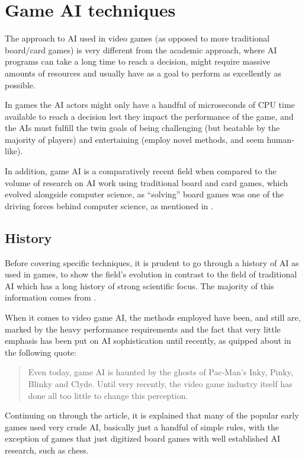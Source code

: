 \documentclass[]{report}
\begin{document}
\section{Game AI techniques}
\label{sec:game-ai-techniques}

The approach to AI used in video games (as opposed to more traditional
board/card games) is very different from the academic approach, where AI
programs can take a long time to reach a decision, might require massive amounts
of resources and usually have as a goal to perform as excellently as possible.

In games the AI actors might only have a handful of microseconds of CPU time
available to reach a decision lest they impact the performance of the game, and
the AIs must fulfill the twin goals of being challenging (but beatable by the
majority of players) and entertaining (employ novel methods, and seem
human-like).

In addition, game AI is a comparatively recent field when compared to the volume
of research on AI work using traditional board and card games, which evolved
alongside computer science, as ``solving'' board games was one of the driving
forces behind computer science, as mentioned in \citet{schaeffer2002games}.

\subsection{History}
\label{sec:game-ai-history}

Before covering specific techniques, it is prudent to go through a history of AI
as used in games, to show the field's evolution in contrast to the field of
traditional AI which has a long history of strong scientific focus. The majority
of this information comes from \citet{tozour2002evolution}.

When it comes to video game AI, the methods employed have been, and still are,
marked by the heavy performance requirements and the fact that very little
emphasis has been put on AI sophistication until recently, as quipped about in
the following quote:

\begin{quote}
  Even today, game AI is haunted by the ghosts of Pac-Man's Inky, Pinky, Blinky
  and Clyde. Until very recently, the video game industry itself has done all
  too little to change this perception.
\end{quote}

Continuing on through the article, it is explained that many of the popular
early games used very crude AI, basically just a handful of simple rules, with
the exception of games that just digitized board games with well established AI
research, such as chess.
\end{document}

